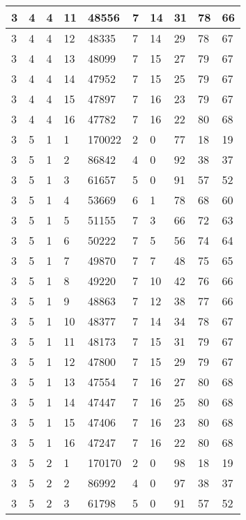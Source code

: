 \begin{table}[!ht]
\begin{tabular}{|l|l|l|l|l|l|l|l|l|l|}
        3 & 4 & 4 & 11 & 48556 & 7 & 14 & 31 & 78 & 66 \\ \hline
        3 & 4 & 4 & 12 & 48335 & 7 & 14 & 29 & 78 & 67 \\ \hline
        3 & 4 & 4 & 13 & 48099 & 7 & 15 & 27 & 79 & 67 \\ \hline
        3 & 4 & 4 & 14 & 47952 & 7 & 15 & 25 & 79 & 67 \\ \hline
        3 & 4 & 4 & 15 & 47897 & 7 & 16 & 23 & 79 & 67 \\ \hline
        3 & 4 & 4 & 16 & 47782 & 7 & 16 & 22 & 80 & 68 \\ \hline
        3 & 5 & 1 & 1 & 170022 & 2 & 0 & 77 & 18 & 19 \\ \hline
        3 & 5 & 1 & 2 & 86842 & 4 & 0 & 92 & 38 & 37 \\ \hline
        3 & 5 & 1 & 3 & 61657 & 5 & 0 & 91 & 57 & 52 \\ \hline
        3 & 5 & 1 & 4 & 53669 & 6 & 1 & 78 & 68 & 60 \\ \hline
        3 & 5 & 1 & 5 & 51155 & 7 & 3 & 66 & 72 & 63 \\ \hline
        3 & 5 & 1 & 6 & 50222 & 7 & 5 & 56 & 74 & 64 \\ \hline
        3 & 5 & 1 & 7 & 49870 & 7 & 7 & 48 & 75 & 65 \\ \hline
        3 & 5 & 1 & 8 & 49220 & 7 & 10 & 42 & 76 & 66 \\ \hline
        3 & 5 & 1 & 9 & 48863 & 7 & 12 & 38 & 77 & 66 \\ \hline
        3 & 5 & 1 & 10 & 48377 & 7 & 14 & 34 & 78 & 67 \\ \hline
        3 & 5 & 1 & 11 & 48173 & 7 & 15 & 31 & 79 & 67 \\ \hline
        3 & 5 & 1 & 12 & 47800 & 7 & 15 & 29 & 79 & 67 \\ \hline
        3 & 5 & 1 & 13 & 47554 & 7 & 16 & 27 & 80 & 68 \\ \hline
        3 & 5 & 1 & 14 & 47447 & 7 & 16 & 25 & 80 & 68 \\ \hline
        3 & 5 & 1 & 15 & 47406 & 7 & 16 & 23 & 80 & 68 \\ \hline
        3 & 5 & 1 & 16 & 47247 & 7 & 16 & 22 & 80 & 68 \\ \hline
        3 & 5 & 2 & 1 & 170170 & 2 & 0 & 98 & 18 & 19 \\ \hline
        3 & 5 & 2 & 2 & 86992 & 4 & 0 & 97 & 38 & 37 \\ \hline
        3 & 5 & 2 & 3 & 61798 & 5 & 0 & 91 & 57 & 52 \\ \hline

\end{tabular}
\end{table}
